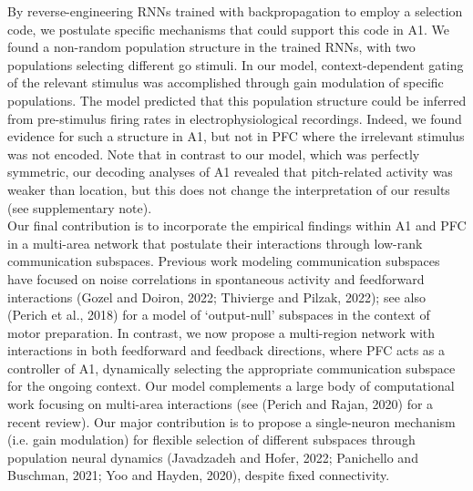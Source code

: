 \documentclass[12pt]{article}
\begin{document}
By reverse-engineering RNNs trained with backpropagation to employ a selection code, we postulate specific mechanisms that could support this code in A1. We found a non-random population structure in the trained RNNs, with two populations selecting different go stimuli. In our model, context-dependent gating of the relevant stimulus was accomplished through gain modulation of specific populations. The model predicted that this population structure could be inferred from pre-stimulus firing rates in electrophysiological recordings. Indeed, we found evidence for such a structure in A1, but not in PFC where the irrelevant stimulus was not encoded. Note that in contrast to our model, which was perfectly symmetric, our decoding analyses of A1 revealed that pitch-related activity was weaker than location, but this does not change the interpretation of our results (see supplementary note). \\

Our final contribution is to incorporate the empirical findings within A1 and PFC in a multi-area network that postulate their interactions through low-rank communication subspaces. Previous work modeling communication subspaces have focused on noise correlations in spontaneous activity and feedforward interactions (Gozel and Doiron, 2022; Thivierge and Pilzak, 2022); see also (Perich et al., 2018) for a model of ‘output-null’ subspaces in the context of motor preparation. In contrast, we now propose a multi-region network with interactions in both feedforward and feedback directions, where PFC acts as a controller of A1, dynamically selecting the appropriate communication subspace for the ongoing context. Our model complements a large body of computational work focusing on multi-area interactions (see (Perich and Rajan, 2020) for a recent review). Our major contribution is to propose a single-neuron mechanism (i.e. gain modulation) for flexible selection of different subspaces through population neural dynamics (Javadzadeh and Hofer, 2022; Panichello and Buschman, 2021; Yoo and Hayden, 2020), despite fixed connectivity. 
\end{document}
